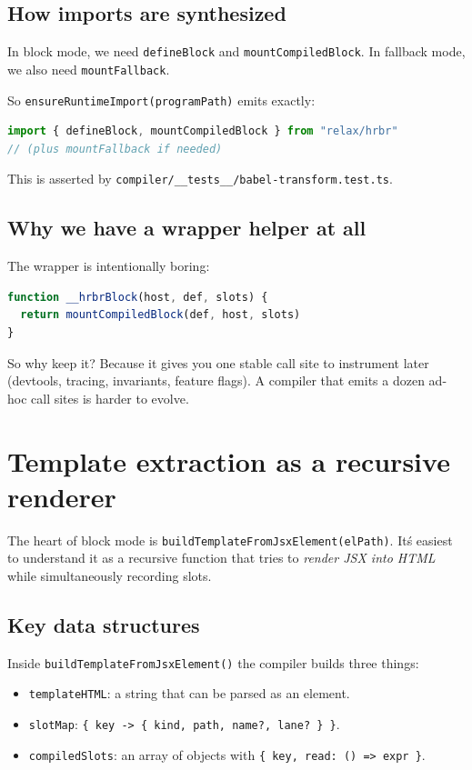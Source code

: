 \subsection{How imports are synthesized}

In block mode, we need \texttt{defineBlock} and \texttt{mountCompiledBlock}.
In fallback mode, we also need \texttt{mountFallback}.

So \texttt{ensureRuntimeImport(programPath)} emits exactly:

\begin{lstlisting}[language=JavaScript]
import { defineBlock, mountCompiledBlock } from "relax/hrbr"
// (plus mountFallback if needed)
\end{lstlisting}

This is asserted by \texttt{compiler/\_\_tests\_\_/babel-transform.test.ts}.

\subsection{Why we have a wrapper helper at all}

The wrapper is intentionally boring:

\begin{lstlisting}[language=JavaScript]
function __hrbrBlock(host, def, slots) {
  return mountCompiledBlock(def, host, slots)
}
\end{lstlisting}

So why keep it?
Because it gives you one stable call site to instrument later (devtools, tracing, invariants, feature flags).
A compiler that emits a dozen ad-hoc call sites is harder to evolve.

\section{Template extraction as a recursive renderer}

The heart of block mode is \texttt{buildTemplateFromJsxElement(elPath)}.
It\'s easiest to understand it as a recursive function that tries to \emph{render JSX into HTML} while simultaneously recording slots.

\subsection{Key data structures}

Inside \texttt{buildTemplateFromJsxElement()} the compiler builds three things:

\begin{itemize}
\item \texttt{templateHTML}: a string that can be parsed as an element.
\item \texttt{slotMap}: \texttt{\{ key -> \{ kind, path, name?, lane? \} \}}.
\item \texttt{compiledSlots}: an array of objects with \texttt{\{ key, read: () => expr \}}.
\end{itemize}

